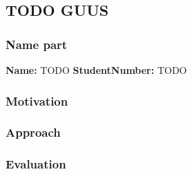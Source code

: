 \subsection{TODO GUUS}
\subsubsection*{Name part}
\textbf{Name:} TODO \indent \textbf{StudentNumber:} TODO

\subsubsection*{Motivation}

\subsubsection*{Approach}

\subsubsection*{Evaluation }